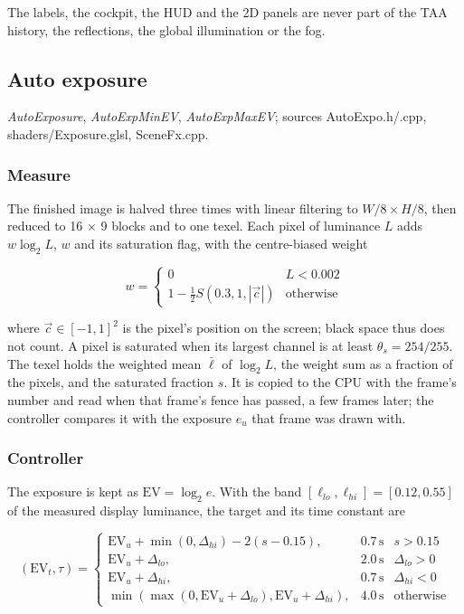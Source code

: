 \documentclass[Orbiter Technical Reference.tex]{subfiles}
\begin{document}
\begin{sloppypar}
\noindent
The labels, the cockpit, the HUD and the 2D panels are never part of the TAA history, the reflections, the global illumination or the fog.


\subsection{Auto exposure}\label{sec:vk_expo}
\textit{AutoExposure}, \textit{AutoExpMinEV}, \textit{AutoExpMaxEV}; sources AutoExpo.h/.cpp, shaders/Exposure.glsl, SceneFx.cpp.

\subsubsection{Measure}
The finished image is halved three times with linear filtering to $W/8 \times H/8$, then reduced to 16 $\times$ 9 blocks and to one texel. Each pixel of luminance $L$ adds $w \log_{2} L$, $w$ and its saturation flag, with the centre-biased weight

\[ w = \left\{ \begin{array}{ll} 0 & L < 0.002 \\ 1 - \frac{1}{2} S(0.3, 1, |\vec{c}|) & \mathrm{otherwise} \end{array} \right. \]

\noindent
where $\vec{c} \in [-1,1]^{2}$ is the pixel's position on the screen; black space thus does not count. A pixel is saturated when its largest channel is at least $\theta_{s} = 254/255$. The texel holds the weighted mean $\bar{\ell}$ of $\log_{2} L$, the weight sum as a fraction of the pixels, and the saturated fraction $s$. It is copied to the CPU with the frame's number and read when that frame's fence has passed, a few frames later; the controller compares it with the exposure $e_{u}$ that frame was drawn with.

\subsubsection{Controller}
The exposure is kept as $\mathrm{EV} = \log_{2} e$. With the band $[\ell_{lo}, \ell_{hi}] = [0.12, 0.55]$ of the measured display luminance, the target and its time constant are

\[ (\mathrm{EV}_{t}, \tau) = \left\{ \begin{array}{lll}
\mathrm{EV}_{u} + \min(0, \Delta_{hi}) - 2(s - 0.15), & 0.7\,\mathrm{s} & s > 0.15 \\
\mathrm{EV}_{u} + \Delta_{lo}, & 2.0\,\mathrm{s} & \Delta_{lo} > 0 \\
\mathrm{EV}_{u} + \Delta_{hi}, & 0.7\,\mathrm{s} & \Delta_{hi} < 0 \\
\min(\max(0, \mathrm{EV}_{u} + \Delta_{lo}), \mathrm{EV}_{u} + \Delta_{hi}), & 4.0\,\mathrm{s} & \mathrm{otherwise}
\end{array} \right. \]


\end{sloppypar}
\end{document}

